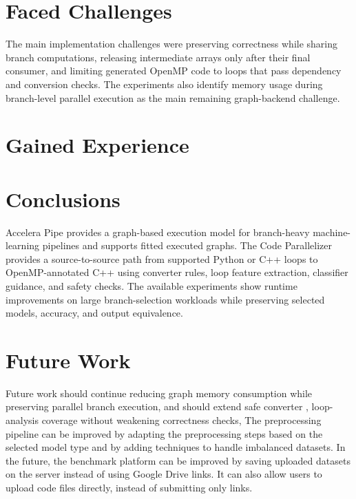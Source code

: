 \documentclass[12pt,a4paper]{report}
\begin{document}
\section{Faced Challenges}
The main implementation challenges were preserving correctness while sharing
branch computations, releasing intermediate arrays only after their final
consumer, and limiting generated OpenMP code to loops that pass dependency and
conversion checks. The experiments also identify memory usage during
branch-level parallel execution as the main remaining graph-backend challenge.

\section{Gained Experience}
\mbox{}

\section{Conclusions}
Accelera Pipe provides a graph-based execution model for branch-heavy
machine-learning pipelines and supports fitted executed graphs. The Code
Parallelizer provides a source-to-source path from supported Python or C++
loops to OpenMP-annotated C++ using converter rules, loop feature extraction,
classifier guidance, and safety checks. The available experiments show runtime
improvements on large branch-selection workloads while preserving selected
models, accuracy, and output equivalence.

\section{Future Work}
Future work should continue reducing graph memory consumption while preserving
parallel branch execution, and should extend safe converter , loop-analysis
coverage without weakening correctness checks, The preprocessing pipeline can be improved by adapting the preprocessing steps based on the selected model type and by adding techniques to handle imbalanced datasets.
In the future, the benchmark platform can be improved by saving uploaded datasets on the server instead of using Google Drive links. It can also allow users to upload code files directly, instead of submitting only links.
\end{document}
